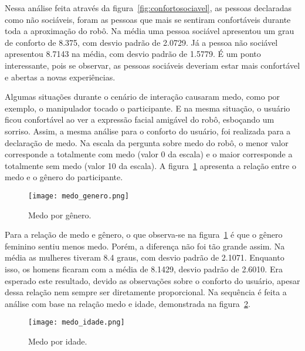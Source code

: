 Nessa análise feita através da figura~\ref{fig:confortosociavel}, as pessoas declaradas como não sociáveis, foram as pessoas que mais se sentiram confortáveis durante toda a aproximação do robô. Na média uma pessoa sociável apresentou um grau de conforto de 8.375, com desvio padrão de 2.0729. Já a pessoa não sociável apresentou 8.7143 na média, com desvio padrão de 1.5779. É um ponto interessante, pois se observar, as pessoas sociáveis deveriam estar mais confortável e abertas a novas experiências.

Algumas situações durante o cenário de interação causaram medo, como por exemplo, o manipulador tocado o participante. E na mesma situação, o usuário ficou confortável ao ver a expressão facial amigável do robô, esboçando um sorriso. Assim, a mesma análise para o conforto do usuário, foi realizada para a declaração de medo. Na escala da pergunta sobre medo do robô, o menor valor corresponde a totalmente com medo (valor 0 da escala) e o maior corresponde a totalmente sem medo (valor 10 da escala). A figura~\ref{fig:medogenero} apresenta a relação entre o medo e o gênero do participante.

\begin{figure}[ht!]
	\centering
	\begin{minipage}{0.65\textwidth}
		\caption{Medo por gênero.}
		\texttt{[image: medo\_genero.png]}
		\label{fig:medogenero}
	\end{minipage}
\end{figure}

Para a relação de medo e gênero, o que observa-se na figura~\ref{fig:medogenero} é que o gênero feminino sentiu menos medo. Porém, a diferença não foi tão grande assim. Na média as mulheres tiveram 8.4 graus, com desvio padrão de 2.1071. Enquanto isso, os homens ficaram com a média de 8.1429, desvio padrão de 2.6010. Era esperado este resultado, devido as observações sobre o conforto do usuário, apesar dessa relação nem sempre ser diretamente proporcional. Na sequência é feita a análise com base na relação medo e idade, demonstrada na figura~\ref{fig:medoidade}.

\begin{figure}[ht!]
	\centering
	\begin{minipage}{0.65\textwidth}
		\caption{Medo por idade.}
		\texttt{[image: medo\_idade.png]}
		\label{fig:medoidade}
	\end{minipage}
\end{figure}

